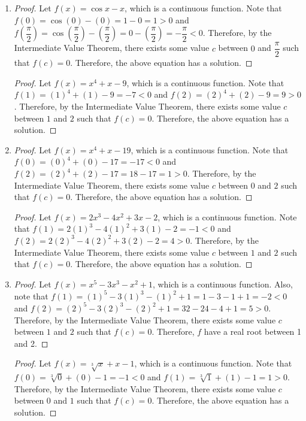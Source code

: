 \documentclass{book}
\begin{document}
\begin{appendices}
\begin{enumerate}[!HW!]
\item 
\begin{proof}
Let $f(x) = \cos x - x$, which is a continuous function. Note that $f(0) = \cos(0) - (0) = 1-0 = 1 > 0$ and $f\left(\dfrac{\pi}{2}\right) = \cos\left(\dfrac{\pi}{2}\right) - \left(\dfrac{\pi}{2}\right) = 0 - \left(\dfrac{\pi}{2}\right) = -\dfrac{\pi}{2} < 0$. Therefore, by the Intermediate Value Theorem, there exists some value $c$ between $0$ and $\dfrac{\pi}{2}$ such that $f(c) = 0$. Therefore, the above equation has a solution.
\end{proof}
\itemspade 
\begin{proof}
Let $f(x) = x^4+x-9$, which is a continuous function. Note that $f(1) = (1)^4+(1)-9 = -7 < 0$ and $f(2) = (2)^4+(2)-9 = 9 > 0$. Therefore, by the Intermediate Value Theorem, there exists some value $c$ between $1$ and $2$ such that $f(c) = 0$. Therefore, the above equation has a solution.
\end{proof}
\item 
\begin{proof}
Let $f(x) = x^4+x-19$, which is a continuous function. Note that $f(0) = (0)^4+(0)-17= -17 < 0$ and $f\left(2\right) = (2)^4+(2) -17 = 18-17 = 1 > 0$. Therefore, by the Intermediate Value Theorem, there exists some value $c$ between $0$ and $2$ such that $f(c) = 0$. Therefore, the above equation has a solution.
\end{proof}
\itemspade 
\begin{proof}
Let $f(x) = 2x^3-4x^2+3x-2$, which is a continuous function. Note that $f(1) = 2(1)^3-4(1)^2+3(1)-2 = -1 < 0$ and $f(2) = 2(2)^3-4(2)^2+3(2)-2 = 4 > 0$. Therefore, by the Intermediate Value Theorem, there exists some value $c$ between $1$ and $2$ such that $f(c) = 0$. Therefore, the above equation has a solution.
\end{proof}
\item 
\begin{proof}
Let $f(x) = x^5-3x^3-x^2+1$, which is a continuous function.  Also, note that $f(1) = (1)^5-3(1)^3-(1)^2+1 = 1-3-1+1 = -2 < 0$ and $f\left(2\right) = (2)^5-3(2)^3-(2)^2+1 = 32-24-4+1= 5> 0$. Therefore, by the Intermediate Value Theorem, there exists some value $c$ between $1$ and $2$ such that $f(c) = 0$. Therefore, $f$ have a real root between 1 and 2.
\end{proof}
\itemspade 
\begin{proof}
Let $f(x) = \sqrt[3]{x}+x-1$, which is a continuous function. Note that $f(0) =\sqrt[3]{0} + (0) - 1 = -1 < 0$ and $f(1) = \sqrt[3]{1} + (1) - 1 = 1 > 0$. Therefore, by the Intermediate Value Theorem, there exists some value $c$ between $0$ and $1$ such that $f(c) = 0$. Therefore, the above equation has a solution.

\end{proof}
\end{enumerate}
\end{appendices}
\end{document}
